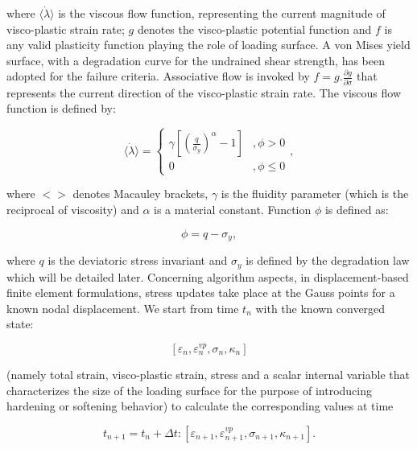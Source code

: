 \documentclass[applsci,journal,article,submit,moreauthors,pdftex]{Definitions/mdpi}
\begin{document}
where  $\langle \dot{\lambda}\rangle$ is the viscous flow function, representing the current magnitude of visco-plastic strain rate; $g$ denotes the visco-plastic potential function and $f$ is any valid plasticity function playing the role of loading surface. A von Mises yield surface, with a degradation curve for the undrained shear strength, has been adopted for the failure criteria. Associative flow is invoked by $f=g . \frac{\partial g}{\partial \sigma}$ that represents the current direction of the visco-plastic strain rate. The viscous flow function is defined by:

\begin{equation}
\langle \dot{\lambda}\rangle=\left\{\begin{array}{cl}\gamma\left[\left(\frac{q}{\sigma_y}\right)^\alpha-1\right] & , \phi>0 \\ 0 & , \phi \leq 0\end{array}\right. ,
\end{equation}


where $<>$ denotes Macauley brackets, $\gamma$ is the fluidity parameter (which is the reciprocal of viscosity) and $\alpha$ is a material constant. Function $\phi$ is defined as:

\begin{equation}
\phi=q-\sigma_y,
\end{equation}

where $q$ is the deviatoric stress invariant and $\sigma_y$ is defined by the degradation law which will be detailed later. Concerning algorithm aspects, in displacement-based finite element formulations, stress updates take place at the Gauss points for a known nodal displacement. We start from time $t_{n}$ with the known converged state: 

\begin{equation}
\left[\varepsilon_{n}, \varepsilon_{n}^{v p}, \sigma_{n}, \kappa_{n}\right]
\end{equation}

(namely total strain, visco-plastic strain, stress and a scalar internal variable that characterizes the size of the loading surface for the purpose of introducing hardening or softening behavior) to calculate the corresponding values at time 

\begin{equation}
t_{n+1}=t_{n}+\Delta t:\left[\varepsilon_{n+1}, \varepsilon_{n+1}^{v p}, \sigma_{n+1}, \kappa_{n+1}\right].
\end{equation}
\end{document}
